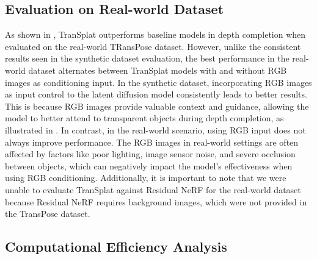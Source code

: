 \subsection{Evaluation on Real-world Dataset}


As shown in , TranSplat outperforms baseline models in depth completion when evaluated on the real-world TRansPose dataset. However, unlike the consistent results seen in the synthetic dataset evaluation, the best performance in the real-world dataset alternates between TranSplat models with and without RGB images as conditioning input. In the synthetic dataset, incorporating RGB images as input control to the latent diffusion model consistently leads to better results. This is because RGB images provide valuable context and guidance, allowing the model to better attend to transparent objects during depth completion, as illustrated in . In contrast, in the real-world scenario, using RGB input does not always improve performance. The RGB images in real-world settings are often affected by factors like poor lighting, image sensor noise, and severe occlusion between objects, which can negatively impact the model's effectiveness when using RGB conditioning. Additionally, it is important to note that we were unable to evaluate TranSplat against Residual NeRF for the real-world dataset because Residual NeRF requires background images, which were not provided in the TransPose dataset.




\subsection{Computational Efficiency Analysis}

